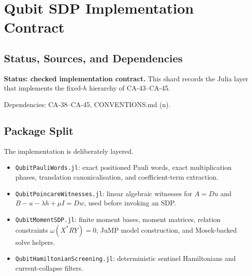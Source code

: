 
\section{Qubit SDP Implementation Contract}
\label{sec:qubit-sdp-implementation-contract}

\subsection{Status, Sources, and Dependencies}

\textbf{Status: checked implementation contract.}  This shard records the
Julia layer that implements the fixed-\(h\) hierarchy of CA-43--CA-45.

Dependencies: CA-38--CA-45, CONVENTIONS.md (n).


\subsection{Package Split}

The implementation is deliberately layered.

\begin{itemize}
\item \texttt{QubitPauliWords.jl}: exact positioned Pauli words, exact
  multiplication phases, translation canonicalisation, and coefficient-term
  extraction.
\item \texttt{QubitPoincareWitnesses.jl}: linear algebraic witnesses for
  \(A=Du\) and \(B-u-\lambda h+\mu I=Dw\), used before invoking an SDP.
\item \texttt{QubitMomentSDP.jl}: finite moment bases, moment matrices,
  relation constraints \(\omega(X^*RY)=0\), JuMP model construction, and
  Mosek-backed solve helpers.
\item \texttt{QubitHamiltonianScreening.jl}: deterministic sentinel
  Hamiltonians and current-collapse filters.
\end{itemize}

